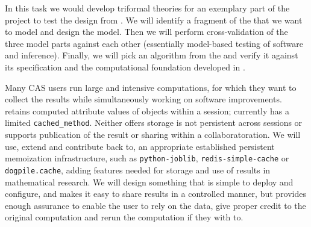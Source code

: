 \begin{workpackage}[id=dksbases,wphases=1-48!.5,
  title=Data/Knowledge/Software-Bases,lead=JU,
  ZHRM=12,JURM=36,UWRM=25,SARM=10,LLRM=2,PSRM=4]
\begin{tasklist}
\begin{task}[title=\LMFDB Case study (triformal theories),id=data-LMFDB,
  lead=JU,partners={ZH,UW}]
  In this task we would develop triformal theories for an exemplary part of the \LMFDB
  project to test the design from .  We will identify a
  fragment of the \LMFDB that we want to model and design the model. Then we will perform
  cross-validation of the three model parts against each other (essentially model-based
  testing of software and inference). Finally, we will pick an algorithm from the \LMFDB
  and verify it against its specification and the computational foundation developed in
  . 
  \end{task}

\begin{task}[title=Memoization and production of new data,id=data-memo,
  lead=SA,partners={US,PS,UW}]
  Many CAS users run large and intensive computations, for which they want to collect the
  results while simultaneously working on software improvements. \GAP
  retains computed attribute values of objects within a session; \Sage currently has a
  limited \lstinline{cached_method}. Neither offers storage is not persistent across sessions or
  supports publication of the result or sharing within a collaboratoration. We
  will use, extend and contribute back to, an appropriate established persistent memoization
  infrastructure, such as \texttt{python-joblib}, \texttt{redis-simple-cache} or
  \texttt{dogpile.cache}, adding features needed for storage and use
  of results in mathematical research. We will design something that
  is simple to deploy and configure, and makes it easy to share
  results in a controlled manner, but provides enough assurance to
  enable the user to rely on the data, give proper credit to the
  original computation and rerun the computation if they with to.

\end{task}
\end{tasklist}


\end{workpackage}

